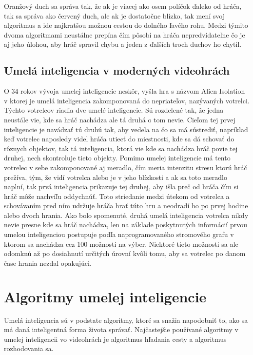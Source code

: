 \documentclass[10pt,oneside,slovak,a4paper]{article}
\begin{document}
Oranžový duch sa správa tak, že ak je viacej ako osem políčok ďaleko od hráča, tak sa správa ako červený duch, ale ak je dostatočne blízko, tak mení svoj algoritmus a ide najkratšou možnou cestou do dolného ľavého rohu. Medzi týmito dvoma algoritmami neustálne prepína čím pôsobí na hráča nepredvídateľne čo je aj jeho úlohou, aby hráč spravil chybu a jeden z ďalších troch duchov ho chytil.

\subsection{Umelá inteligencia v moderných videohrách} \label{kapitola2.3}
O 34 rokov vývoja umelej inteligencie neskôr, vyšla hra s názvom Alien Isolation v ktorej je umelá inteligencia zakomponovaná do nepriateľov, nazývaných votrelci. Týchto votrelcov riadia dve umelé inteligencie. \cite{AlienIsolationAI} Sú rozdelené tak, že jedna neustále vie, kde sa hráč nachádza ale tá druhá o tom nevie. Cieľom tej prvej inteligencie je navádzať tú druhú tak, aby vedela na čo sa má sústrediť, napríklad keď votrelec naposledy videl hráča utiecť do miestnosti, kde sa dá schovať do rôznych objektov, tak tá inteligencia, ktorá vie kde sa nachádza hráč povie tej druhej, nech skontroluje tieto objekty. Pomimo umelej inteligencie má tento votrelec v sebe zakomponované aj meradlo, čím meria intenzitu stresu ktorú hráč prežíva, tým, že vidí votrelca alebo je v jeho blízkosti a ak sa toto meradlo naplní, tak prvá inteligencia prikazuje tej druhej, aby išla preč od hráča čím si hráč môže nachvíľu oddychnúť. Toto striedanie medzi útekom od votrelca a schovávaním pred ním udržuje hráča hrať túto hru a neodradí ho po prvej hodine alebo dvoch hrania. Ako bolo spomenuté, druhá umelá inteligencia votrelca nikdy nevie presne kde sa hráč nachádza, len na základe poskytnutých informácií prvou umelou inteligenciou postupuje podľa naprogramovaného stromového grafu v ktorom sa nachádza cez 100 možností na výber. Niektoré tieto možnosti sa ale odomknú až po dosiahnutí určitých úrovní kvôli tomu, aby sa votrelec po danom čase hrania nezdal opakujúci.


\section{Algoritmy umelej inteligencie} \label{kapitola3}
Umelá inteligencia sú v podstate algoritmy, ktoré sa snažia napodobniť to, ako sa má daná inteligentná forma života správať. Najčastejšie používané algoritmy v umelej inteligencii vo videohrách je algoritmus hľadania cesty a algoritmus rozhodovania sa.
\end{document}

